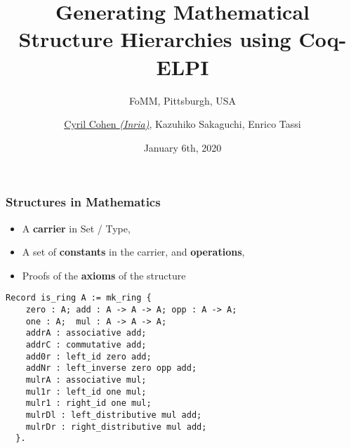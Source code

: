 \documentclass[11pt]{beamer}
\begin{document}
\title[Structure Hierarchies in Coq-ELPI]{{Generating Mathematical} {Structure Hierarchies} {using Coq-ELPI}}
\subtitle{FoMM, Pittsburgh, USA}

\author[\underline{Cohen}, Sakaguchi, Tassi]{
  \underline{Cyril Cohen \textit{(Inria)}}, Kazuhiko Sakaguchi, Enrico
Tassi}


\date{January 6th, 2020}

\begin{frame}
\titlepage
\end{frame}

\begin{frame}[fragile]
  \frametitle{Structures in Mathematics}

  \begin{itemize}
  \item A \textbf{carrier} in Set / Type,
  \item A set of \textbf{constants} in the carrier, and \textbf{operations},
  \item Proofs of the \textbf{axioms} of the structure
  \end{itemize}

  \pause

\begin{lstlisting}
Record is_ring A := mk_ring {
    zero : A; add : A -> A -> A; opp : A -> A;
    one : A;  mul : A -> A -> A;
    addrA : associative add;
    addrC : commutative add;
    add0r : left_id zero add;
    addNr : left_inverse zero opp add;
    mulrA : associative mul;
    mul1r : left_id one mul;
    mulr1 : right_id one mul;
    mulrDl : left_distributive mul add;
    mulrDr : right_distributive mul add;
  }.
\end{lstlisting}

\end{frame}
\end{document}
